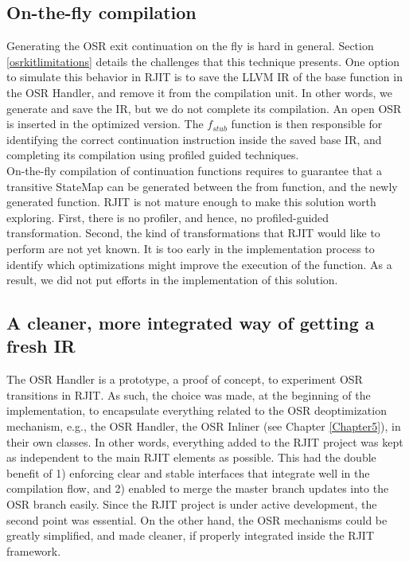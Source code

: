 \subsection{On-the-fly compilation}

Generating the OSR exit continuation on the fly is hard in general. 
Section \ref{osrkitlimitations} details the challenges that this technique presents.
One option to simulate this behavior in RJIT is to save the LLVM IR of the base function in the OSR Handler, and remove it from the compilation unit.
In other words, we generate and save the IR, but we do not complete its compilation.
An open OSR is inserted in the optimized version. 
The $f_{stub}$ function is then responsible for identifying the correct continuation instruction inside the saved base IR, and completing its compilation using profiled guided techniques.\\

On-the-fly compilation of continuation functions requires to guarantee that a transitive StateMap can be generated between the from function, and the newly generated function.
RJIT is not mature enough to make this solution worth exploring.
First, there is no profiler, and hence, no profiled-guided transformation. 
Second, the kind of transformations that RJIT would like to perform are not yet known. 
It is too early in the implementation process to identify which optimizations might improve the execution of the function.
As a result, we did not put efforts in the implementation of this solution.\\

\subsection{A cleaner, more integrated way of getting a fresh IR}

The OSR Handler is a prototype, a proof of concept, to experiment OSR transitions in RJIT. 
As such, the choice was made, at the beginning of the implementation, to encapsulate everything related to the OSR deoptimization mechanism, e.g., the OSR Handler, the OSR Inliner (see Chapter \ref{Chapter5}), in their own classes.
In other words, everything added to the RJIT project was kept as independent to the main RJIT elements as possible.
This had the double benefit of 1) enforcing clear and stable interfaces that integrate well in the compilation flow, and 2) enabled to merge the master branch updates into the OSR branch easily.
Since the RJIT project is under active development, the second point was essential.
On the other hand, the OSR mechanisms could be greatly simplified, and made cleaner, if properly integrated inside the RJIT framework.\\


